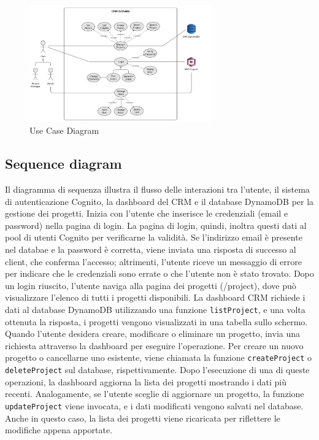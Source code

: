 \documentclass[target=bach,aauheader=,style=]{thud}
\begin{document}
\begin{figure}[h!]
    \centering
    \includegraphics[width=0.7\textwidth]{img/diagrammi/use_case.pdf} 
    \caption{Use Case Diagram}
\end{figure}

\subsection{Sequence diagram}
Il diagramma di sequenza illustra il flusso delle interazioni tra l'utente, il sistema di autenticazione Cognito, la dashboard del CRM e il database DynamoDB per la gestione dei progetti. Inizia con l'utente che inserisce le credenziali (email e password) nella pagina di login. La pagina di login, quindi, inoltra questi dati al pool di utenti Cognito per verificarne la validità. Se l'indirizzo email è presente nel databae e la password è corretta, viene inviata una risposta di successo al client, che conferma l'accesso; altrimenti, l'utente riceve un messaggio di errore per indicare che le credenziali sono errate o che l'utente non è stato trovato. Dopo un login riuscito, l'utente naviga alla pagina dei progetti (/project), dove può visualizzare l'elenco di tutti i progetti disponibili. La dashboard CRM richiede i dati al database DynamoDB utilizzando una funzione \texttt{listProject}, e una volta ottenuta la risposta, i progetti vengono visualizzati in una tabella sullo schermo. Quando l'utente desidera creare, modificare o eliminare un progetto, invia una richiesta attraverso la dashboard per eseguire l'operazione. Per creare un nuovo progetto o cancellarne uno esistente, viene chiamata la funzione \texttt{createProject} o \texttt{deleteProject} sul database, rispettivamente. Dopo l'esecuzione di una di queste operazioni, la dashboard aggiorna la lista dei progetti mostrando i dati più recenti. Analogamente, se l'utente sceglie di aggiornare un progetto, la funzione \texttt{updateProject} viene invocata, e i dati modificati vengono salvati nel database. Anche in questo caso, la lista dei progetti viene ricaricata per riflettere le modifiche appena apportate.
\end{document}
